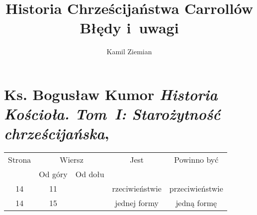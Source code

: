 \documentclass[a4paper,11pt]{article}
\title{Historia Chrześcijaństwa Carrollów \\
  {\Large Błędy i~uwagi}}
\author{Kamil Ziemian}
\numberwithin{equation}{section}
\begin{document}





\maketitle  %









\section{Ks. Bogusław Kumor
  \textit{Historia Kościoła. Tom~I: Starożytność chrześcijańska},
  \cite{KumorHistoriaKosciolaVolI2003}}





\begin{center}

  \begin{tabular}{|c|c|c|c|c|}
    \hline
    Strona & \multicolumn{2}{c|}{Wiersz} & Jest
                              & Powinno być \\ \cline{2-3}
    & Od góry & Od dołu & & \\
    \hline
    14 & 11 & & rzeciwieństwie & przeciwieństwie \\
    14 & 15 & & jednej formy & jedną formę \\
    \hline
  \end{tabular}

\end{center}




\end{document}
